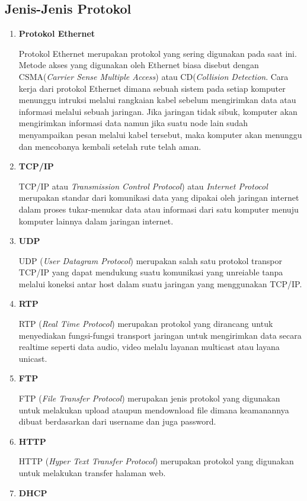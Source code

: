 \subsection{Jenis-Jenis Protokol}
\begin{enumerate}
\item \textbf{Protokol Ethernet}

Protokol Ethernet merupakan protokol yang sering digunakan pada saat ini. Metode akses yang digunakan oleh Ethernet biasa disebut dengan CSMA(\textit{Carrier Sense Multiple Access}) atau CD(\textit{Collision Detection}. Cara kerja dari protokol Ethernet dimana sebuah sistem pada setiap komputer menunggu intruksi melalui rangkaian kabel sebelum mengirimkan data atau informasi melalui sebuah jaringan. Jika jaringan tidak sibuk, komputer akan mengirimkan informasi data namun jika suatu node lain sudah menyampaikan pesan melalui kabel tersebut, maka komputer akan menunggu dan mencobanya kembali setelah rute telah aman.
\item \textbf{TCP/IP}

TCP/IP atau \textit{Transmission Control Protocol}) atau \textit{Internet Protocol} merupakan standar dari komunikasi data yang dipakai oleh jaringan internet dalam proses tukar-menukar data atau informasi dari satu komputer menuju komputer lainnya dalam jaringan internet.
\item \textbf{UDP}

UDP (\textit{User Datagram Protocol}) merupakan salah satu protokol transpor TCP/IP yang dapat mendukung suatu komunikasi yang unreiable tanpa melalui koneksi antar host dalam suatu jaringan yang menggunakan TCP/IP.
\item \textbf{RTP}

RTP (\textit{Real Time Protocol}) merupakan protokol yang dirancang untuk menyediakan fungsi-fungsi transport jaringan untuk mengirimkan data secara realtime seperti data audio, video melalu layanan multicast atau layana unicast.
\item \textbf{FTP}

FTP (\textit{File Transfer Protocol}) merupakan jenis protokol yang digunakan untuk melakukan upload ataupun mendownload file dimana keamanannya dibuat berdasarkan dari username dan juga password.
\item \textbf{HTTP}

HTTP (\textit{Hyper Text Transfer Protocol}) merupakan protokol yang digunakan untuk melakukan transfer halaman web.
\item \textbf{DHCP}


\end{enumerate}
